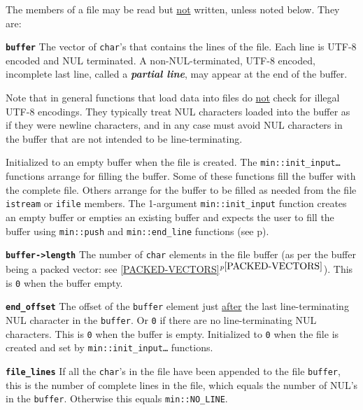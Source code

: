 \documentclass[12pt]{article}
\makeatletter
\newcommand{\TT}[1]{{\tt \bfseries #1}}
\newcommand{\key}[1]{{\bf \em #1}\index{#1}}
\newcommand{\ttmkey}[2]{\TT{#1}\index{#1@{\tt #1}!#2}}
\newcommand{\itemref}[1]{\ref{#1}$^{p\pageref{#1}}$}
\newcommand{\pagref}[1]{p\pageref{#1}}
\newcommand{\EOL}{\penalty \exhyphenpenalty}
\newcommand{\GT}{{\tt >}}
\newenvironment{itemlist}[1][1.2in]%
	{\begin{list}{}{\setlength{\labelwidth}{#1}%
		        \setlength{\leftmargin}{\labelwidth}%
		        \addtolength{\leftmargin}{+0.2in}%
		        \renewcommand{\makelabel}[1]{##1\hfill}}}%
	{\end{list}}
\makeatother
\begin{document}
The members of a file may be read but \underline{not} written, unless
noted below.  They are:

\begin{itemlist}[1.4in]

\item[\ttmkey{buffer}{in {\tt min::file}}]
The vector of {\tt char}'s that contains the lines of the file.  Each
line is UTF-8 encoded and NUL terminated.  A non-NUL-terminated, UTF-8
encoded, incomplete
last line, called a \key{partial line}, may appear at the end of the buffer.

Note that in general functions that load data into files do \underline{not}
check for illegal UTF-8 encodings.  They typically treat NUL characters
loaded into the buffer as if they were newline characters, and in any
case must avoid NUL characters in the buffer that are not intended
to be line-terminating.

Initialized to an empty buffer when the file is created.  The
{\tt min::\EOL init\_\EOL input\ldots} functions arrange for filling
the buffer.
Some of these functions fill the buffer with the complete file.
Others arrange for the buffer to be filled as needed from
the file {\tt istream} or {\tt ifile} members.  The 1-argument
{\tt min::\EOL init\_\EOL input} function creates an empty buffer
or empties an existing buffer and expects the user to fill the
buffer using {\tt min::\EOL push} and {\tt min::\EOL end\_\EOL line}
functions (see \pagref{WRITING-FILE-BUFFER}).

\item[\ttmkey{buffer-\GT length}{in {\tt min::file}}]
The number of {\tt char} elements in the file buffer
(as per the buffer being a packed vector: see \itemref{PACKED-VECTORS}).
This is {\tt 0} when the buffer empty.

\item[\ttmkey{end\_\EOL offset}{in {\tt min::file}}]
The offset of the {\tt buffer} element just \underline{after} the last
line-terminating NUL character in the {\tt buffer}.  Or {\tt 0} if there
are no line-terminating NUL characters.
This is {\tt 0} when the buffer is empty.
Initialized to {\tt 0} when the file is created and set by
{\tt min::\EOL init\_\EOL input\ldots} functions.

\item[\ttmkey{file\_\EOL lines}{in {\tt min::file}}]
If all the {\tt char}'s in the file have been appended to the file {\tt buffer},
this is the number of complete lines in the file, which equals
the number of NUL's in the {\tt buffer}.  Otherwise this equals
{\tt min::\EOL NO\_\EOL LINE}.


\end{itemlist}
\end{document}
